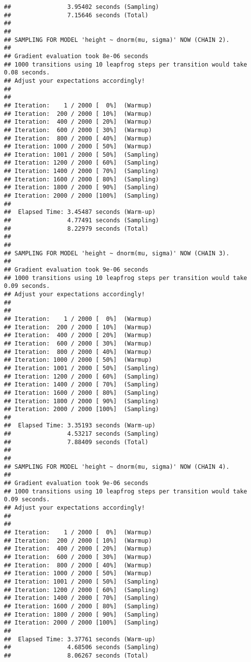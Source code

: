 \documentclass[]{article}
\begin{document}
\begin{verbatim}
##                3.95402 seconds (Sampling)
##                7.15646 seconds (Total)
## 
## 
## SAMPLING FOR MODEL 'height ~ dnorm(mu, sigma)' NOW (CHAIN 2).
## 
## Gradient evaluation took 8e-06 seconds
## 1000 transitions using 10 leapfrog steps per transition would take 0.08 seconds.
## Adjust your expectations accordingly!
## 
## 
## Iteration:    1 / 2000 [  0%]  (Warmup)
## Iteration:  200 / 2000 [ 10%]  (Warmup)
## Iteration:  400 / 2000 [ 20%]  (Warmup)
## Iteration:  600 / 2000 [ 30%]  (Warmup)
## Iteration:  800 / 2000 [ 40%]  (Warmup)
## Iteration: 1000 / 2000 [ 50%]  (Warmup)
## Iteration: 1001 / 2000 [ 50%]  (Sampling)
## Iteration: 1200 / 2000 [ 60%]  (Sampling)
## Iteration: 1400 / 2000 [ 70%]  (Sampling)
## Iteration: 1600 / 2000 [ 80%]  (Sampling)
## Iteration: 1800 / 2000 [ 90%]  (Sampling)
## Iteration: 2000 / 2000 [100%]  (Sampling)
## 
##  Elapsed Time: 3.45487 seconds (Warm-up)
##                4.77491 seconds (Sampling)
##                8.22979 seconds (Total)
## 
## 
## SAMPLING FOR MODEL 'height ~ dnorm(mu, sigma)' NOW (CHAIN 3).
## 
## Gradient evaluation took 9e-06 seconds
## 1000 transitions using 10 leapfrog steps per transition would take 0.09 seconds.
## Adjust your expectations accordingly!
## 
## 
## Iteration:    1 / 2000 [  0%]  (Warmup)
## Iteration:  200 / 2000 [ 10%]  (Warmup)
## Iteration:  400 / 2000 [ 20%]  (Warmup)
## Iteration:  600 / 2000 [ 30%]  (Warmup)
## Iteration:  800 / 2000 [ 40%]  (Warmup)
## Iteration: 1000 / 2000 [ 50%]  (Warmup)
## Iteration: 1001 / 2000 [ 50%]  (Sampling)
## Iteration: 1200 / 2000 [ 60%]  (Sampling)
## Iteration: 1400 / 2000 [ 70%]  (Sampling)
## Iteration: 1600 / 2000 [ 80%]  (Sampling)
## Iteration: 1800 / 2000 [ 90%]  (Sampling)
## Iteration: 2000 / 2000 [100%]  (Sampling)
## 
##  Elapsed Time: 3.35193 seconds (Warm-up)
##                4.53217 seconds (Sampling)
##                7.88409 seconds (Total)
## 
## 
## SAMPLING FOR MODEL 'height ~ dnorm(mu, sigma)' NOW (CHAIN 4).
## 
## Gradient evaluation took 9e-06 seconds
## 1000 transitions using 10 leapfrog steps per transition would take 0.09 seconds.
## Adjust your expectations accordingly!
## 
## 
## Iteration:    1 / 2000 [  0%]  (Warmup)
## Iteration:  200 / 2000 [ 10%]  (Warmup)
## Iteration:  400 / 2000 [ 20%]  (Warmup)
## Iteration:  600 / 2000 [ 30%]  (Warmup)
## Iteration:  800 / 2000 [ 40%]  (Warmup)
## Iteration: 1000 / 2000 [ 50%]  (Warmup)
## Iteration: 1001 / 2000 [ 50%]  (Sampling)
## Iteration: 1200 / 2000 [ 60%]  (Sampling)
## Iteration: 1400 / 2000 [ 70%]  (Sampling)
## Iteration: 1600 / 2000 [ 80%]  (Sampling)
## Iteration: 1800 / 2000 [ 90%]  (Sampling)
## Iteration: 2000 / 2000 [100%]  (Sampling)
## 
##  Elapsed Time: 3.37761 seconds (Warm-up)
##                4.68506 seconds (Sampling)
##                8.06267 seconds (Total)
\end{verbatim}
\end{document}
